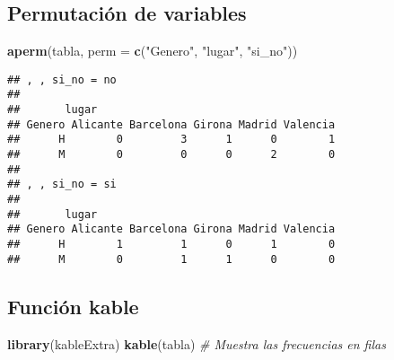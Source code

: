 \documentclass[]{article}
\newenvironment{Shaded}{\begin{snugshade}}{\end{snugshade}}
\newcommand{\CommentTok}[1]{\textcolor[rgb]{0.56,0.35,0.01}{\textit{#1}}}
\newcommand{\DataTypeTok}[1]{\textcolor[rgb]{0.13,0.29,0.53}{#1}}
\newcommand{\KeywordTok}[1]{\textcolor[rgb]{0.13,0.29,0.53}{\textbf{#1}}}
\newcommand{\NormalTok}[1]{#1}
\newcommand{\StringTok}[1]{\textcolor[rgb]{0.31,0.60,0.02}{#1}}
\begin{document}
\hypertarget{permutacion-de-variables}{%
\subsection{Permutación de variables}\label{permutacion-de-variables}}

\begin{Shaded}
\begin{Highlighting}[]
\KeywordTok{aperm}\NormalTok{(tabla, }\DataTypeTok{perm =} \KeywordTok{c}\NormalTok{(}\StringTok{"Genero"}\NormalTok{, }\StringTok{"lugar"}\NormalTok{, }\StringTok{"si_no"}\NormalTok{))}
\end{Highlighting}
\end{Shaded}

\begin{verbatim}
## , , si_no = no
## 
##       lugar
## Genero Alicante Barcelona Girona Madrid Valencia
##      H        0         3      1      0        1
##      M        0         0      0      2        0
## 
## , , si_no = si
## 
##       lugar
## Genero Alicante Barcelona Girona Madrid Valencia
##      H        1         1      0      1        0
##      M        0         1      1      0        0
\end{verbatim}

\hypertarget{funcion-kable}{%
\subsection{Función kable}\label{funcion-kable}}

\begin{Shaded}
\begin{Highlighting}[]
\KeywordTok{library}\NormalTok{(kableExtra)}
\KeywordTok{kable}\NormalTok{(tabla) }\CommentTok{# Muestra las frecuencias en filas}
\end{Highlighting}
\end{Shaded}
\end{document}
